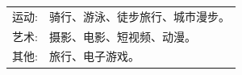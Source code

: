 
\begin{tabular}{rl}
    \textsc{运动:} & 骑行、游泳、徒步旅行、城市漫步。\\
    \textsc{艺术:} & 摄影、电影、短视频、动漫。\\ 
    \textsc{其他:} & 旅行、电子游戏。\\
\end{tabular}